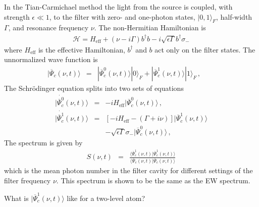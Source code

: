 \documentclass[twocolumn,aps,eqsecnum,showkeys,amsmath]{revtex4}
\begin{document}
In the Tian-Carmichael method the light from the source is coupled, 
with strength $\epsilon \ll 1$, to the filter with zero- and one-photon 
states, $|0,1 \rangle_F$, half-width $\Gamma$, and resonance frequency 
$\nu$. The non-Hermitian Hamiltonian is 
%
\begin{eqnarray}
\mathcal{H} = H_{\mathrm{eff}} +(\nu -i\Gamma)b^{\dag}b 
	-i\sqrt{\epsilon \Gamma} b^{\dag} \sigma_-
\end{eqnarray}
where $H_{\mathrm{eff}}$ is the effective Hamiltonian, $b^{\dag}$ and 
$b$ act only on the filter states. The unnormalized wave function is 
%
\begin{eqnarray}
|\overline{\Psi}_c (\nu,t)\rangle  &=& 
|\overline{\Psi}_c^0 (\nu,t) \rangle |0 \rangle_F 
+|\overline{\Psi}_c^1 (\nu,t)\rangle |1 \rangle_F \,, \qquad
\end{eqnarray}
The Schr\"odinger equation splits into two sets of equations
%
\begin{subequations}
\begin{eqnarray}
|\dot{\overline{\Psi}_c^0} (\nu,t) \rangle 
	&=& - i H_{\mathrm{eff}} |\overline{\Psi}_c^0(\nu,t) \rangle \,, 	\\
%
|\dot{\overline{\Psi}_c^1}(\nu,t) \rangle &=& \left[ -i H_{\mathrm{eff}} 
 -(\Gamma +i\nu) \right] |\overline{\Psi}_c^1 (\nu,t) \rangle  \nonumber \\
&& -\sqrt{\epsilon \Gamma} \sigma_- |\overline{\Psi}_c^0 (\nu,t) 
	\rangle \,, 	
\end{eqnarray}
\end{subequations}
The spectrum is given by 
%
\begin{eqnarray}
S(\nu,t) &=& 
\frac{ \langle \overline{\Psi}_c^1(\nu,t) |\overline{\Psi}_c^1(\nu,t) 
\rangle }{ \langle \overline{\Psi}_c(\nu,t) |\overline{\Psi}_c(\nu,t) 
\rangle } 
\end{eqnarray}
which is the mean photon number in the filter cavity for different 
settings of the filter frequency $\nu$. This spectrum is shown to be the 
same as the EW spectrum. 

What is $|\overline{\Psi}_c^1 (\nu,t)\rangle$ like for a two-level atom?




\end{document}
